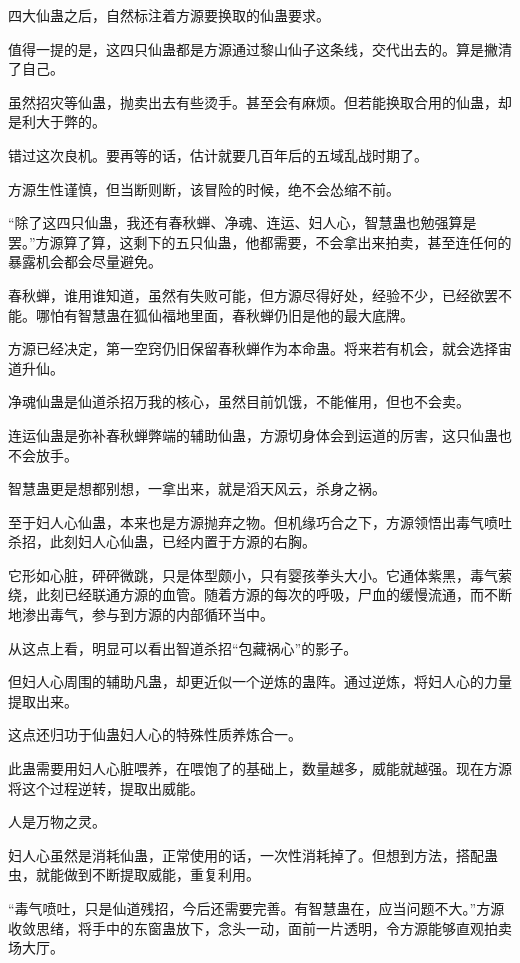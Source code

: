 \begin{this_body}
四大仙蛊之后，自然标注着方源要换取的仙蛊要求。

值得一提的是，这四只仙蛊都是方源通过黎山仙子这条线，交代出去的。算是撇清了自己。

虽然招灾等仙蛊，抛卖出去有些烫手。甚至会有麻烦。但若能换取合用的仙蛊，却是利大于弊的。

错过这次良机。要再等的话，估计就要几百年后的五域乱战时期了。

方源生性谨慎，但当断则断，该冒险的时候，绝不会怂缩不前。

“除了这四只仙蛊，我还有春秋蝉、净魂、连运、妇人心，智慧蛊也勉强算是罢。”方源算了算，这剩下的五只仙蛊，他都需要，不会拿出来拍卖，甚至连任何的暴露机会都会尽量避免。

春秋蝉，谁用谁知道，虽然有失败可能，但方源尽得好处，经验不少，已经欲罢不能。哪怕有智慧蛊在狐仙福地里面，春秋蝉仍旧是他的最大底牌。

方源已经决定，第一空窍仍旧保留春秋蝉作为本命蛊。将来若有机会，就会选择宙道升仙。

净魂仙蛊是仙道杀招万我的核心，虽然目前饥饿，不能催用，但也不会卖。

连运仙蛊是弥补春秋蝉弊端的辅助仙蛊，方源切身体会到运道的厉害，这只仙蛊也不会放手。

智慧蛊更是想都别想，一拿出来，就是滔天风云，杀身之祸。

至于妇人心仙蛊，本来也是方源抛弃之物。但机缘巧合之下，方源领悟出毒气喷吐杀招，此刻妇人心仙蛊，已经内置于方源的右胸。

它形如心脏，砰砰微跳，只是体型颇小，只有婴孩拳头大小。它通体紫黑，毒气萦绕，此刻已经联通方源的血管。随着方源的每次的呼吸，尸血的缓慢流通，而不断地渗出毒气，参与到方源的内部循环当中。

从这点上看，明显可以看出智道杀招“包藏祸心”的影子。

但妇人心周围的辅助凡蛊，却更近似一个逆炼的蛊阵。通过逆炼，将妇人心的力量提取出来。

这点还归功于仙蛊妇人心的特殊性质养炼合一。

此蛊需要用妇人心脏喂养，在喂饱了的基础上，数量越多，威能就越强。现在方源将这个过程逆转，提取出威能。

人是万物之灵。

妇人心虽然是消耗仙蛊，正常使用的话，一次性消耗掉了。但想到方法，搭配蛊虫，就能做到不断提取威能，重复利用。

“毒气喷吐，只是仙道残招，今后还需要完善。有智慧蛊在，应当问题不大。”方源收敛思绪，将手中的东窗蛊放下，念头一动，面前一片透明，令方源能够直观拍卖场大厅。


\end{this_body}
